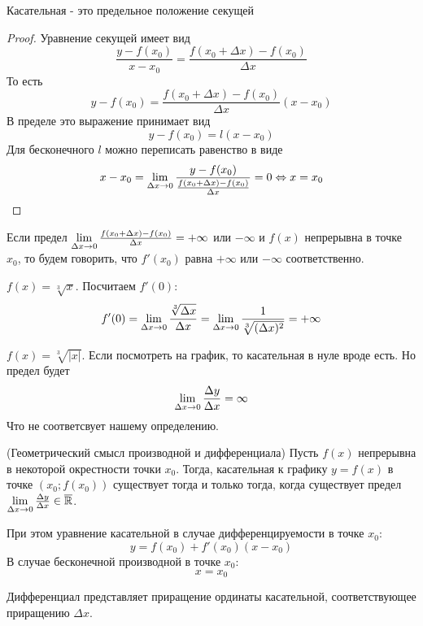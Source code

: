 \begin{proposition}
	Касательная - это предельное положение секущей
\end{proposition}

\begin{proof}
	Уравнение секущей имеет вид
	\[
	\frac{y - f(x_0)}{x - x_0} = \frac{f(x_0 + \Delta x) - f(x_0)}{\Delta x}
	\]
	То есть
	\[
	y - f(x_0) = \frac{f(x_0 + \Delta x) - f(x_0)}{\Delta x} (x - x_0)
	\]
	В пределе это выражение принимает вид
	\[
		y - f(x_0) = l(x - x_0)
	\]
	Для бесконечного $l$ можно переписать равенство в виде
	\[
		x - x_0 = \lim\limits_{\Delta x \to 0} \frac{y - f(x_0)}{\frac{f(x_0 + \Delta x) - f(x_0)}{\Delta x}} = 0 \Leftrightarrow x = x_0
	\]
\end{proof}

\begin{definition}
	Если предел $\lim\limits_{\Delta x \to 0} \frac{f(x_0 + \Delta x) - f(x_0)}{\Delta x} = +\infty$ или $-\infty$ и $f(x)$ непрерывна в точке $x_0$, то будем говорить, что $f'(x_0)$ равна $+\infty$ или $-\infty$ соответственно.
\end{definition}

\begin{example}
	$f(x) = \sqrt[3]{x}$. Посчитаем $f'(0)$:
	\[
	f'(0) = \lim\limits_{\Delta x \to 0} \frac{\sqrt[3]{\Delta x}}{\Delta x} = \lim\limits_{\Delta x \to 0} \frac{1}{\sqrt[3]{(\Delta x)^2}} = +\infty
	\]
\end{example}

\begin{example}
	$f(x) = \sqrt[3]{|x|}$. Если посмотреть на график, то касательная в нуле вроде есть. Но предел будет
	\[
	\lim\limits_{\Delta x \to 0} \frac{\Delta y}{\Delta x} = \infty
	\]
	Что не соответсвует нашему определению.
\end{example}

\begin{theorem} (Геометрический смысл производной и дифференциала)
	Пусть $f(x)$ непрерывна в некоторой окрестности точки $x_0$. Тогда, касательная к графику $y = f(x)$ в точке $(x_0; f(x_0))$ существует тогда и только тогда, когда существует предел $\lim\limits_{\Delta x \to 0} \frac{\Delta y}{\Delta x} \in \overline{\mathbb{R}}$. 
	
	При этом уравнение касательной в случае дифференцируемости в точке $x_0$:
	\[
	y = f(x_0) + f'(x_0)(x - x_0)
	\]
	В случае бесконечной производной в точке $x_0$:
	\[
	x = x_0
	\]
	
	Дифференциал представляет приращение ординаты касательной, соответствующее приращению $\Delta x$.
\end{theorem}

